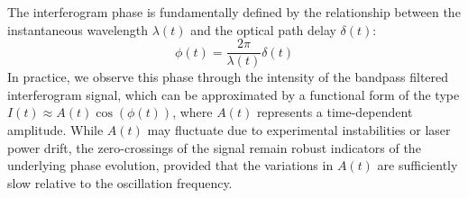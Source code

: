 \documentclass[8pt,a4paper]{report}
\begin{document}
	The interferogram phase is fundamentally defined by the relationship between the instantaneous wavelength $\lambda(t)$ and the optical path delay $\delta(t)$:
	\begin{equation}
		\phi(t) = \frac{2\pi}{\lambda (t)} \delta(t)
	\end{equation}
	In practice, we observe this phase through the intensity of the bandpass filtered interferogram signal, which can be approximated by a functional form of the type $I(t) \approx A(t) \cos(\phi(t)) $, where $A(t)$ represents a time-dependent amplitude. While $A(t)$ may fluctuate due to experimental instabilities or laser power drift, the zero-crossings of the signal remain robust indicators of the underlying phase evolution, provided that the variations in $A(t)$ are sufficiently slow relative to the oscillation frequency.
	
\end{document}
